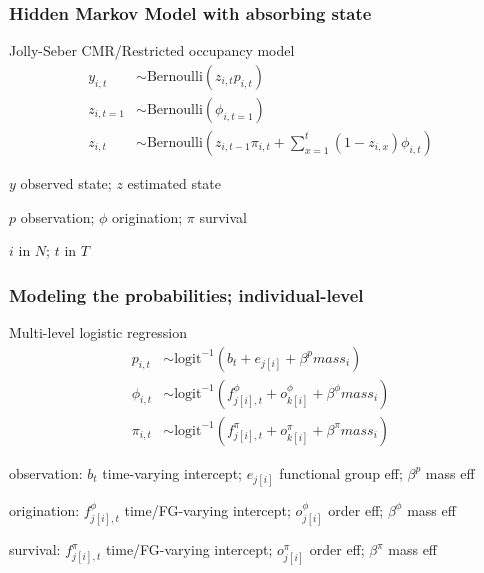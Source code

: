 \documentclass{beamer}
\begin{document}
\begin{frame}
  \frametitle{Hidden Markov Model with absorbing state}
  \begin{block}{Jolly-Seber CMR/Restricted occupancy model}
    \setlength\abovedisplayskip{-0.3cm}
    \begin{align*}
      y_{i, t} &\sim \text{Bernoulli}(z_{i, t} p_{i, t}) \\
      z_{i, t = 1} &\sim \text{Bernoulli}(\phi_{i, t = 1}) \\
      z_{i, t} &\sim \text{Bernoulli}\left(z_{i, t - 1} \pi_{i,t} + \sum_{x = 1}^{t}(1 - z_{i, x}) \phi_{i, t}\right)
    \end{align*}
    \begin{scriptsize}
      \(y\) observed state; \(z\) estimated state

      \(p\) observation; \(\phi\) origination; \(\pi\) survival

      \(i\) in \(N\); \(t\) in \(T\)
    \end{scriptsize}
  \end{block}
\end{frame}

\begin{frame}
  \frametitle{Modeling the probabilities; individual-level}
  \begin{block}{Multi-level logistic regression}
    \setlength\abovedisplayskip{-0.3cm}
    \begin{align*}
      p_{i, t} &\sim \text{logit}^{-1}(b_{t} + e_{j[i]} + \beta^{p} mass_{i}) \\
      \phi_{i, t} &\sim \text{logit}^{-1}(f^{\phi}_{j[i], t} + o^{\phi}_{k[i]} + \beta^{\phi} mass_{i}) \\
      \pi_{i, t} &\sim \text{logit}^{-1}(f^{\pi}_{j[i], t} + o^{\pi}_{k[i]} + \beta^{\pi} mass_{i})
    \end{align*}
    \begin{scriptsize}
      observation: \(b_{t}\) time-varying intercept; \(e_{j[i]}\) functional group eff; \(\beta^{p}\) mass eff

      origination: \(f^{\phi}_{j[i], t}\) time/FG-varying intercept; \(o^{\phi}_{j[i]}\) order eff; \(\beta^{\phi}\) mass eff

      survival: \(f^{\pi}_{j[i], t}\) time/FG-varying intercept; \(o^{\pi}_{j[i]}\) order eff; \(\beta^{\pi}\) mass eff
    \end{scriptsize}
  \end{block}
\end{frame}
\end{document}
